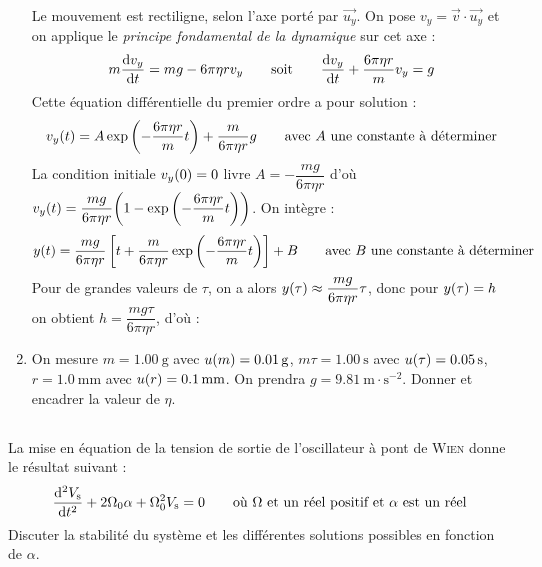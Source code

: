 \documentclass[a4paper,french,bookmarks]{book}
\begin{document}
\begin{enumerate}
{            Le mouvement est rectiligne, selon l'axe porté par $\vec{u_y}$. On pose $v_y = \vec{v} \cdot \vec{u_y}$ et on applique le \textit{principe fondamental de la dynamique} sur cet axe :
            \[ m\dfrac{\mathrm d v_y}{\mathrm d t} = mg - 6\pi\eta r v_y \qquad\text{soit}\qquad \dfrac{\mathrm d v_y}{\mathrm d t} + \dfrac{6\pi\eta r}{m}v_y = g\]
            Cette équation différentielle du premier ordre a pour solution :
            \[ v_y\p{t} = A\exp{-\dfrac{6\pi\eta r}{m}t} + \dfrac{m}{6\pi\eta r}g \qquad\text{avec} \ A \ \text{une constante à déterminer}\]
            La condition initiale $v_y\!\left(0\right) = 0$ livre $A = -\dfrac{mg}{6\pi\eta r}$ d'où $v_y\p{t} = \dfrac{mg}{6\pi\eta r}\p{1 - \exp{-\dfrac{6\pi\eta r}{m}t}}$. On intègre :
            \[ y\p{t} = \dfrac{mg}{6\pi\eta r}\intc{t + \dfrac{m}{6\pi\eta r}\exp{-\dfrac{6\pi\eta r}{m}t}} + B \qquad\text{avec} \ B \ \text{une constante à déterminer}\]
            Pour de grandes valeurs de $\tau$, on a alors $y\!\left(\tau\right) \approx \dfrac{mg}{6\pi\eta r}\tau$, donc pour $y\!\left(\tau\right) = h$ on obtient $h = \dfrac{mg\tau}{6\pi\eta r}$, d'où :
        }
        \nobefore\yesafter
        \boxansconc{
            \[ \eta = \dfrac{mg\tau}{6\pi rh}\]
        }
        \yesbefore
        
        \item On mesure $m = \SI{1.00}{\g}$ avec $u\p{m} = \SI{0.01}{\g}$, $m\tau= \SI{1.00}{\s}$ avec $u\p{\tau} = \SI{0.05}{\s}$, $r = \SI{1.0}{\mm}$ avec $u\p{r} = \SI{0.1}{\mm}$. On prendra $g = \SI{9.81}{\m \cdot \s^{-2}}$. Donner et encadrer la valeur de $\eta$.
    \end{enumerate}
    
    \subsection{}
    
    La mise en équation de la tension de sortie de l'oscillateur à pont de \textsc{Wien} donne le résultat suivant :
    \[ \dfrac{\mathrm d^2 V_\text s}{\mathrm d t^2} + 2\Omega_0 \alpha + \Omega_0^2V_\text s = 0 \qquad\text{où} \ \Omega \ \text{et un réel positif et} \ \alpha \ \text{est un réel}\]
    Discuter la stabilité du système et les différentes solutions possibles en fonction de $\alpha$.
    
    
\end{document}
